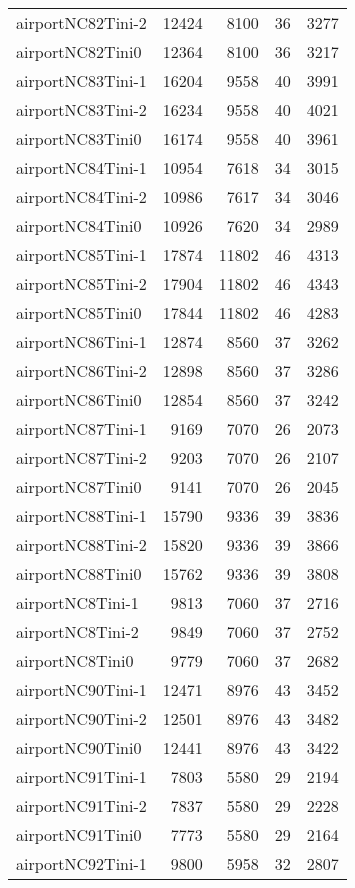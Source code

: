 \begin{longtable}{lrrrr}
airportNC82Tini-2 & 12424 & 8100 & 36 & 3277 \\
airportNC82Tini0 & 12364 & 8100 & 36 & 3217 \\
airportNC83Tini-1 & 16204 & 9558 & 40 & 3991 \\
airportNC83Tini-2 & 16234 & 9558 & 40 & 4021 \\
airportNC83Tini0 & 16174 & 9558 & 40 & 3961 \\
airportNC84Tini-1 & 10954 & 7618 & 34 & 3015 \\
airportNC84Tini-2 & 10986 & 7617 & 34 & 3046 \\
airportNC84Tini0 & 10926 & 7620 & 34 & 2989 \\
airportNC85Tini-1 & 17874 & 11802 & 46 & 4313 \\
airportNC85Tini-2 & 17904 & 11802 & 46 & 4343 \\
airportNC85Tini0 & 17844 & 11802 & 46 & 4283 \\
airportNC86Tini-1 & 12874 & 8560 & 37 & 3262 \\
airportNC86Tini-2 & 12898 & 8560 & 37 & 3286 \\
airportNC86Tini0 & 12854 & 8560 & 37 & 3242 \\
airportNC87Tini-1 & 9169 & 7070 & 26 & 2073 \\
airportNC87Tini-2 & 9203 & 7070 & 26 & 2107 \\
airportNC87Tini0 & 9141 & 7070 & 26 & 2045 \\
airportNC88Tini-1 & 15790 & 9336 & 39 & 3836 \\
airportNC88Tini-2 & 15820 & 9336 & 39 & 3866 \\
airportNC88Tini0 & 15762 & 9336 & 39 & 3808 \\
airportNC8Tini-1 & 9813 & 7060 & 37 & 2716 \\
airportNC8Tini-2 & 9849 & 7060 & 37 & 2752 \\
airportNC8Tini0 & 9779 & 7060 & 37 & 2682 \\
airportNC90Tini-1 & 12471 & 8976 & 43 & 3452 \\
airportNC90Tini-2 & 12501 & 8976 & 43 & 3482 \\
airportNC90Tini0 & 12441 & 8976 & 43 & 3422 \\
airportNC91Tini-1 & 7803 & 5580 & 29 & 2194 \\
airportNC91Tini-2 & 7837 & 5580 & 29 & 2228 \\
airportNC91Tini0 & 7773 & 5580 & 29 & 2164 \\
airportNC92Tini-1 & 9800 & 5958 & 32 & 2807 \\

\end{longtable}
